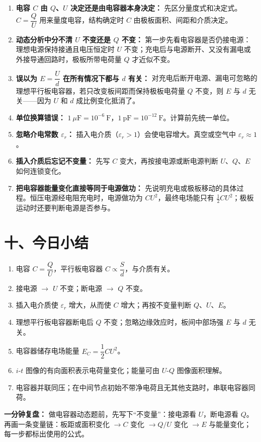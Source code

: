 \begin{mistakebox}
\begin{enumerate}
  \item \textbf{电容 $C$ 由 $Q$、$U$ 决定还是由电容器本身决定：} 先区分量度式和决定式。$C=\dfrac{Q}{U}$ 用来量度电容，结构确定时 $C$ 由极板面积、间距和介质决定。

  \item \textbf{动态分析中分不清 $U$ 不变还是 $Q$ 不变：} 第一步先看电容器是否仍接电源：理想电源保持接通且电压恒定时 $U$ 不变；充电后与电源断开、又没有漏电或外接导通回路时，极板所带电荷量 $Q$ 才近似不变。

  \item \textbf{误以为 $E = \dfrac{U}{d}$ 在所有情况下都与 $d$ 有关：} 对充电后断开电源、漏电可忽略的理想平行板电容器，若只改变板间距而保持极板电荷量 $Q$ 不变，则 $E$ 与 $d$ 无关——因为 $U$ 和 $d$ 成比例变化抵消了。

  \item \textbf{单位换算错误：} $1\ \mu\mathrm{F} = 10^{-6}\ \mathrm{F}$，$1\ \mathrm{pF} = 10^{-12}\ \mathrm{F}$。计算前先统一单位。

  \item \textbf{忽略介电常数 $\varepsilon_r$：} 插入电介质（$\varepsilon_r > 1$）会使电容增大。真空或空气中 $\varepsilon_r \approx 1$。

  \item \textbf{插入介质后忘记不变量：} 先写 $C$ 变大，再按接电源或断电源判断 $U$、$Q$、$E$ 如何连锁变化。

  \item \textbf{把电容器能量变化直接等同于电源做功：} 先说明充电或极板移动的具体过程。恒压电源经电阻充电时，电源做功为 $CU^2$，最终电场能只有 $\frac12CU^2$；极板运动时还要判断电源是否参与。
\end{enumerate}
\end{mistakebox}

\section*{十、今日小结}

\begin{enumerate}
  \item 电容 $C = \dfrac{Q}{U}$，平行板电容器 $C \propto \dfrac{S}{d}$，与介质有关。
  \item 接电源 $\to$ $U$ 不变；断电源 $\to$ $Q$ 不变。
  \item 插入电介质使 $\varepsilon_r$ 增大，从而使 $C$ 增大；再按不变量判断 $Q$、$U$、$E$。
  \item 理想平行板电容器断电后 $Q$ 不变；忽略边缘效应时，板间中部场强 $E$ 与 $d$ 无关。
  \item 电容器储存电场能量 $E_C = \dfrac12 CU^2$。
  \item $i$-$t$ 图像的有向面积表示电荷量变化；能量可由 $U$-$Q$ 图像面积理解。
  \item 电容器并联同压；在中间节点初始不带净电荷且无其他支路时，串联电容器同荷。
\end{enumerate}

\textbf{一分钟复盘：} 做电容器动态题前，先写下“不变量”：接电源看 $U$，断电源看 $Q$。再画一条变量链：板距或面积变化 $\to C$ 变化 $\to Q/U$ 变化 $\to E$ 与能量变化；每一步都标出使用的公式。
